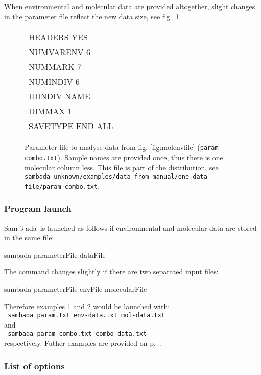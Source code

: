 \documentclass[a4paper,11pt]{article}
\newcommand{\versionnumber}{unknown}
\newcommand{\smb}{\textsf{Sam$\upbeta$ada}}
\newcommand{\pathtodatafrommanual}{\texttt{sambada-\versionnumber/examples/data-from-manual/}}
\newcommand{\pathtoonedatafile}{\pathtodatafrommanual\texttt{one-data-file/}}
\newenvironment{launch}{\begin{mdframed}\ttfamily}{\end{mdframed}}
\begin{document}
When environmental and molecular data are provided altogether, slight changes in the parameter file reflect the new data size, see fig.~\ref{fig:fichier-param-combo}.
\begin{figure}[htbp]
\centering
\ttfamily
\begin{tabular}{|l|}
\hline
HEADERS YES\\	
NUMVARENV 6\\	
NUMMARK 7	\\
NUMINDIV 6\\
IDINDIV NAME\\
DIMMAX 1\\
SAVETYPE END ALL\\
\hline
\end{tabular}%
\caption{Parameter file to analyse data from fig. \ref{fig:molenvfile} (\texttt{param-combo.txt}).
Sample names are provided once, thus there is one molecular column less.
This file is part of the distribution, see \pathtoonedatafile\texttt{param-combo.txt}.
}
\label{fig:fichier-param-combo}
\end{figure}


\subsubsection{Program launch}

\smb\ is launched as follows if environmental and molecular data are stored in the same file:
\begin{launch} sambada parameterFile dataFile\end{launch}
The command changes slightly if there are two separated input files:\\
\begin{launch} sambada parameterFile envFile molecularFile \end{launch}

\noindent Therefore examples 1 and 2 would be launched with:\\
\verb+ sambada param.txt env-data.txt mol-data.txt+\\
and\\
\verb+ sambada param-combo.txt combo-data.txt+\\
respectively.
Futher examples are provided on p.~\pageref{sec:examples-launch}.

\subsubsection{List of options\label{seq:liste-options}}
\end{document}
